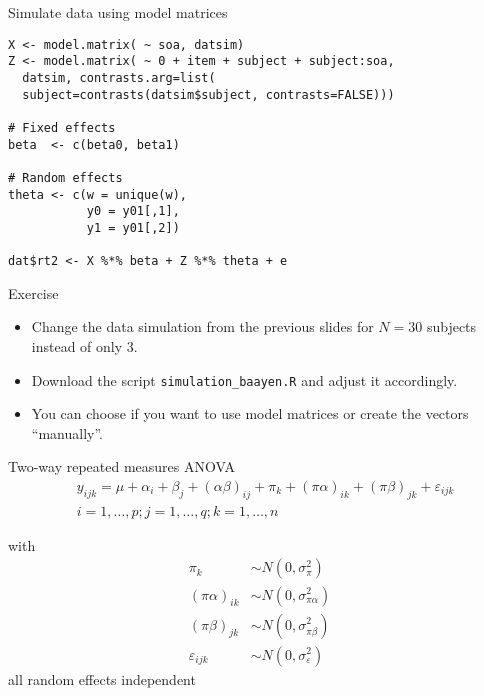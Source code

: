 \documentclass{beamer}
\begin{document}
{

\begin{frame}[fragile]{Simulate data using model matrices}
  \begin{lstlisting}
X <- model.matrix( ~ soa, datsim)
Z <- model.matrix( ~ 0 + item + subject + subject:soa,
  datsim, contrasts.arg=list(
  subject=contrasts(datsim$subject, contrasts=FALSE)))

# Fixed effects
beta  <- c(beta0, beta1)

# Random effects
theta <- c(w = unique(w),
           y0 = y01[,1],
           y1 = y01[,2])

dat$rt2 <- X %*% beta + Z %*% theta + e
  \end{lstlisting}
\end{frame}

}

\begin{frame}[fragile]{}
  \begin{block}{Exercise}
    \begin{itemize}
      \item Change the data simulation from the previous slides for $N =
        30$ subjects instead of only 3.
      \item Download the script \verb+simulation_baayen.R+ and adjust it
        accordingly.
      \item You can choose if you want to use model matrices or create
        the vectors ``manually''.
    \end{itemize}
  \end{block}
\end{frame}


\begin{frame}{Two-way repeated measures ANOVA}
  \begin{align*}
    &   y_{ijk} = \mu + \alpha_i + \beta_j + (\alpha\beta)_{ij} + \pi_k +
        (\pi\alpha)_{ik} + (\pi\beta)_{jk} + \varepsilon_{ijk}\\
    &  i = 1,\dots,p; j = 1,\dots,q; k = 1,\dots,n
  \end{align*}

     with
  \begin{align*}
    \pi_k & \sim N(0, \sigma^2_{\pi})\\
    (\pi\alpha)_{ik} & \sim N(0, \sigma^2_{\pi\alpha})\\
    (\pi\beta)_{jk} & \sim N(0, \sigma^2_{\pi\beta})\\
    \varepsilon_{ijk} & \sim N(0, \sigma^2_{\varepsilon})
  \end{align*}
     all random effects independent
\vfill
\end{frame}
\end{document}
